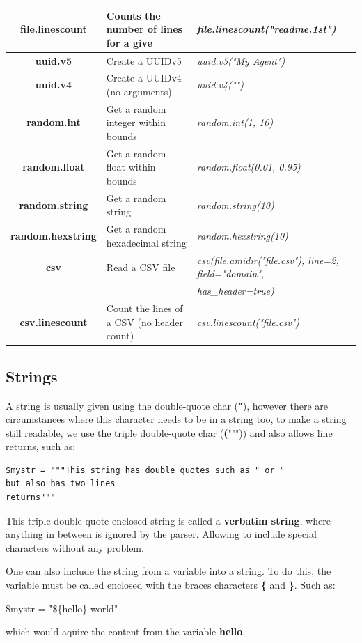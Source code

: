 \documentclass[10pt]{article}
\begin{document}
\begin{tabular}{|c|l|l|}
  \hline
  \textbf{file.linescount} & Counts the number of lines for a give & \textit{file.linescount("readme.1st")}\\
  \hline
  \textbf{uuid.v5} & Create a UUIDv5 & \textit{uuid.v5("My Agent")}\\
  \hline
  \textbf{uuid.v4} & Create a UUIDv4 (no arguments) & \textit{uuid.v4("")}\\
  \hline
  \textbf{random.int} & Get a random integer within bounds & \textit{random.int(1, 10)}\\
  \hline
  \textbf{random.float} & Get a random float within bounds & \textit{random.float(0.01, 0.95)}\\
  \hline
  \textbf{random.string} & Get a random string & \textit{random.string(10)}\\
  \hline
  \textbf{random.hexstring} & Get a random hexadecimal string & \textit{random.hexstring(10)}\\
  \hline
  \textbf{csv} & Read a CSV file & \textit{csv(file.amidir("file.csv"), line=2, field="domain",}\\
    & & \textit{has\_header=true)}\\  
  \hline
  \textbf{csv.linescount} & Count the lines of a CSV (no header count)& \textit{csv.linescount("file.csv")}\\
  \hline
\end{tabular}

\subsection{Strings}

A string is usually given using the double-quote char (\textbf{"}), however there are circumstances where this character needs to be in a string too, to make a string still readable, we use the triple double-quote char (\textbf(""")) and also allows line returns, such as:

\begin{lstlisting}[caption={Verbatim String},captionpos=b]
$mystr = """This string has double quotes such as " or "
but also has two lines
returns"""
\end{lstlisting}

This triple double-quote enclosed string is called a \textbf{verbatim string}, where anything in between is ignored by the parser. Allowing to include special characters without any problem.

One can also include the string from a variable into a string. To do this, the variable must be called enclosed with the braces characters \textbf{\{} and \textbf{\}}. Such as:
\begin{center}
  \$mystr = "\$\{hello\} world"
\end{center}
which would aquire the content from the variable \textbf{hello}.
\end{document}
